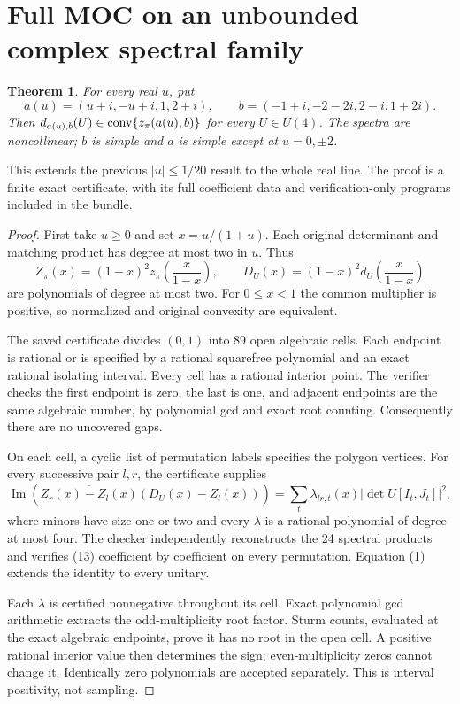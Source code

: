 \documentclass[11pt]{article}
\newtheorem{theorem}{Theorem}[section]\newtheorem{proposition}[theorem]{Proposition}
\newcommand{\Ima}{\operatorname{Im}}\newcommand{\rank}{\operatorname{rank}}
\begin{document}
\section{Full MOC on an unbounded complex spectral family}
\begin{theorem}\label{allreal}
For every real $u$, put
\[
a(u)=(u+i,-u+i,1,2+i),\qquad b=(-1+i,-2-2i,2-i,1+2i).
\]
Then $d_{a(u),b}(U)\in\operatorname{conv}\{z_\pi(a(u),b)\}$ for every $U\in U(4)$.
The spectra are noncollinear; $b$ is simple and $a$ is simple except at $u=0,\pm2$.
\end{theorem}

This extends the previous $|u|\le1/20$ result to the whole real line. The proof is a finite exact certificate, with its full coefficient data and verification-only programs included in the bundle.

\begin{proof}
First take $u\ge0$ and set $x=u/(1+u)$. Each original determinant and matching product has degree at most two in $u$. Thus
\[
Z_\pi(x)=(1-x)^2z_\pi\!\left(\frac{x}{1-x}\right),\qquad
D_U(x)=(1-x)^2d_U\!\left(\frac{x}{1-x}\right)
\]
are polynomials of degree at most two. For $0\le x<1$ the common multiplier is positive, so normalized and original convexity are equivalent.

The saved certificate divides $(0,1)$ into 89 open algebraic cells. Each endpoint is rational or is specified by a rational squarefree polynomial and an exact rational isolating interval. Every cell has a rational interior point. The verifier checks the first endpoint is zero, the last is one, and adjacent endpoints are the same algebraic number, by polynomial gcd and exact root counting. Consequently there are no uncovered gaps.

On each cell, a cyclic list of permutation labels specifies the polygon vertices. For every successive pair $l,r$, the certificate supplies
\[
\Ima\!\left(\overline{Z_r(x)-Z_l(x)}(D_U(x)-Z_l(x))\right)
 =\sum_t\lambda_{lr,t}(x)|\det U[I_t,J_t]|^2,
\tag{13}
\]
where minors have size one or two and every $\lambda$ is a rational polynomial of degree at most four. The checker independently reconstructs the 24 spectral products and verifies (13) coefficient by coefficient on every permutation. Equation (1) extends the identity to every unitary.

Each $\lambda$ is certified nonnegative throughout its cell. Exact polynomial gcd arithmetic extracts the odd-multiplicity root factor. Sturm counts, evaluated at the exact algebraic endpoints, prove it has no root in the open cell. A positive rational interior value then determines the sign; even-multiplicity zeros cannot change it. Identically zero polynomials are accepted separately. This is interval positivity, not sampling.


\end{proof}
\end{document}
